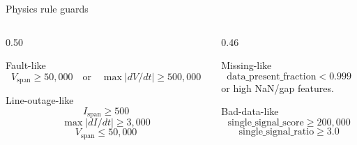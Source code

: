 \documentclass[aspectratio=169,10pt,t]{beamer}
\begin{document}
\begin{frame}{Physics rule guards}
\small
\begin{columns}[T,totalwidth=\textwidth]
\begin{column}{0.50\textwidth}
\begin{block}{Fault-like}
\[
V_{\mathrm{span}} \ge 50{,}000
\quad\mathrm{or}\quad
\max |dV/dt| \ge 500{,}000
\]
\end{block}
\begin{block}{Line-outage-like}
\[
I_{\mathrm{span}} \ge 500
\]
\[
\max |dI/dt| \ge 3{,}000
\]
\[
V_{\mathrm{span}} \le 50{,}000
\]
\end{block}
\end{column}
\begin{column}{0.46\textwidth}
\begin{alertblock}{Missing-like}
\[
\mathrm{data\_present\_fraction}<0.999
\]
or high NaN/gap features.
\end{alertblock}
\begin{alertblock}{Bad-data-like}
\[
\mathrm{single\_signal\_score}\ge 200{,}000
\]
\[
\mathrm{single\_signal\_ratio}\ge 3.0
\]
\end{alertblock}
\end{column}
\end{columns}
\end{frame}
\end{document}
